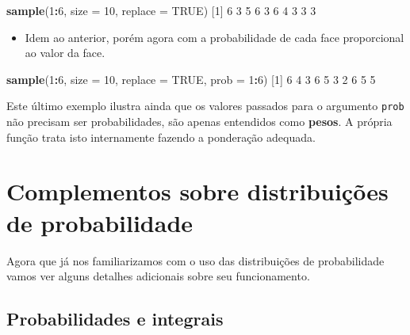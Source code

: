 \documentclass[10pt,a4paper]{book}
\newenvironment{Shaded}{\begin{snugshade}}{\end{snugshade}}
\newcommand{\KeywordTok}[1]{\textcolor[rgb]{0.13,0.29,0.53}{\textbf{#1}}}
\newcommand{\DataTypeTok}[1]{\textcolor[rgb]{0.13,0.29,0.53}{#1}}
\newcommand{\DecValTok}[1]{\textcolor[rgb]{0.00,0.00,0.81}{#1}}
\newcommand{\OtherTok}[1]{\textcolor[rgb]{0.56,0.35,0.01}{#1}}
\newcommand{\OperatorTok}[1]{\textcolor[rgb]{0.81,0.36,0.00}{\textbf{#1}}}
\newcommand{\NormalTok}[1]{#1}
\providecommand{\tightlist}{%
  \setlength{\itemsep}{0pt}\setlength{\parskip}{0pt}}
\begin{document}
\begin{Shaded}
\begin{Highlighting}[]
\KeywordTok{sample}\NormalTok{(}\DecValTok{1}\OperatorTok{:}\DecValTok{6}\NormalTok{, }\DataTypeTok{size =} \DecValTok{10}\NormalTok{, }\DataTypeTok{replace =} \OtherTok{TRUE}\NormalTok{)}
\NormalTok{ [}\DecValTok{1}\NormalTok{] }\DecValTok{6} \DecValTok{3} \DecValTok{5} \DecValTok{6} \DecValTok{3} \DecValTok{6} \DecValTok{4} \DecValTok{3} \DecValTok{3} \DecValTok{3}
\end{Highlighting}
\end{Shaded}

\begin{itemize}
\tightlist
\item
  Idem ao anterior, porém agora com a probabilidade de cada face
  proporcional ao valor da face.
\end{itemize}

\begin{Shaded}
\begin{Highlighting}[]
\KeywordTok{sample}\NormalTok{(}\DecValTok{1}\OperatorTok{:}\DecValTok{6}\NormalTok{, }\DataTypeTok{size =} \DecValTok{10}\NormalTok{, }\DataTypeTok{replace =} \OtherTok{TRUE}\NormalTok{,  }\DataTypeTok{prob =} \DecValTok{1}\OperatorTok{:}\DecValTok{6}\NormalTok{)}
\NormalTok{ [}\DecValTok{1}\NormalTok{] }\DecValTok{6} \DecValTok{4} \DecValTok{3} \DecValTok{6} \DecValTok{5} \DecValTok{3} \DecValTok{2} \DecValTok{6} \DecValTok{5} \DecValTok{5}
\end{Highlighting}
\end{Shaded}

Este último exemplo ilustra ainda que os valores passados para o
argumento \texttt{prob} não precisam ser probabilidades, são apenas
entendidos como \textbf{pesos}. A própria função trata isto internamente
fazendo a ponderação adequada.

\section{Complementos sobre distribuições de
probabilidade}\label{complementos-sobre-distribuiuxe7uxf5es-de-probabilidade}

Agora que já nos familiarizamos com o uso das distribuições de
probabilidade vamos ver alguns detalhes adicionais sobre seu
funcionamento.

\subsection{Probabilidades e
integrais}\label{probabilidades-e-integrais}
\end{document}
